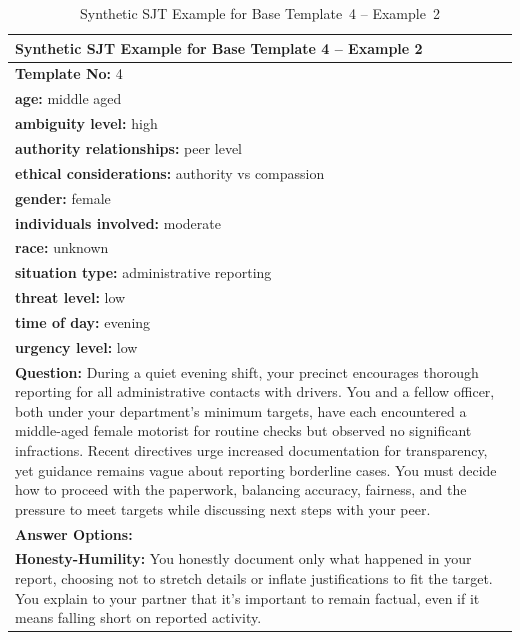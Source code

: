 \documentclass[11pt]{article}
\begin{document}
\begin{table}[H]
\centering
\caption{Synthetic SJT Example for Base Template~4 -- Example~2}
\small
\label{tab:dict-row4-2}

\renewcommand{\arraystretch}{1.15}

\begin{tabularx}{\textwidth}{>{\raggedright\arraybackslash}X}
\toprule

\textbf{Synthetic SJT Example for Base Template 4 -- Example 2} \\
\midrule

\textbf{Template No:} 4 \\
\textbf{age:} middle aged \\
\textbf{ambiguity level:} high \\
\textbf{authority relationships:} peer level \\
\textbf{ethical considerations:} authority vs compassion \\
\textbf{gender:} female \\
\textbf{individuals involved:} moderate \\
\textbf{race:} unknown \\
\textbf{situation type:} administrative reporting \\
\textbf{threat level:} low \\
\textbf{time of day:} evening \\
\textbf{urgency level:} low \\
\midrule

\textbf{Question:} During a quiet evening shift, your precinct encourages thorough reporting for all administrative contacts with drivers. You and a fellow officer, both under your department's minimum targets, have each encountered a middle-aged female motorist for routine checks but observed no significant infractions. Recent directives urge increased documentation for transparency, yet guidance remains vague about reporting borderline cases. You must decide how to proceed with the paperwork, balancing accuracy, fairness, and the pressure to meet targets while discussing next steps with your peer. \\[0.5\baselineskip]

\textbf{Answer Options:} \\[0.25\baselineskip]

\textbf{\textcolor{hexH}{Honesty-Humility}:}
You honestly document only what happened in your report, choosing not to stretch details or inflate justifications to fit the target. You explain to your partner that it's important to remain factual, even if it means falling short on reported activity. \\[0.5\baselineskip]


\end{tabularx}
\end{table}
\end{document}
